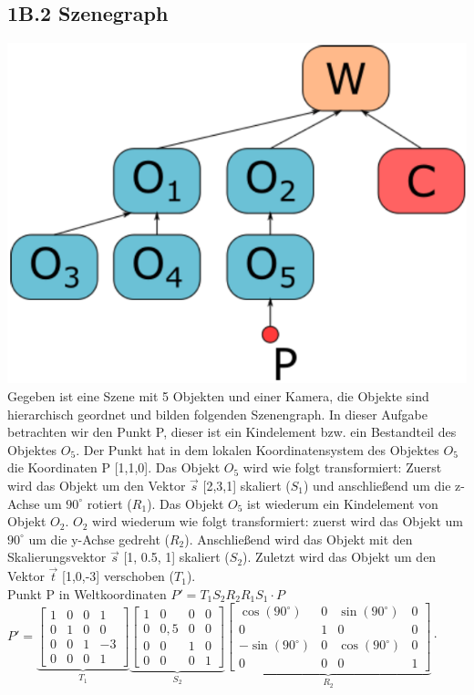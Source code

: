 \documentclass[11pt, a4paper]{article} %
\begin{document}
\subsection*{1B.2 Szenegraph}
\includegraphics[scale=0.5]{sg.png} \\
Gegeben ist eine Szene mit 5 Objekten und einer Kamera, die Objekte sind hierarchisch geordnet und bilden folgenden Szenengraph. In dieser Aufgabe betrachten wir den Punkt P, dieser ist ein Kindelement bzw. ein Bestandteil des Objektes $O_5$. Der Punkt hat in dem lokalen Koordinatensystem des Objektes $O_5$ die Koordinaten P [1,1,0]. Das Objekt $O_5$ wird wie folgt transformiert: Zuerst wird das Objekt um den Vektor $\vec{s}$ [2,3,1] skaliert ($S_1$) und anschließend um die z-Achse um $90^\circ$ rotiert ($R_1$). Das Objekt $O_5$ ist wiederum ein Kindelement von Objekt $O_2$. $O_2$ wird wiederum wie folgt transformiert: zuerst wird das Objekt um $90^\circ$ um die y-Achse gedreht ($R_2$). Anschließend wird das Objekt mit den Skalierungsvektor $\vec{s}$ [1, 0.5, 1] skaliert ($S_2$). Zuletzt wird das Objekt um den Vektor $\vec{t}$ [1,0,-3] verschoben ($T_1$). \\
Punkt P in Weltkoordinaten $P'= T_1S_2R_2R_1S_1\cdot P$ \\[0.5cm]
$P' = \underbrace{\begin{bmatrix}
	1 & 0 & 0 & 1 \\ 0 & 1 & 0 & 0 \\ 0 & 0 & 1 & -3 \\ 0 & 0 & 0 & 1
\end{bmatrix}}_{T_1} \underbrace{\begin{bmatrix}
1 & 0 & 0 & 0 \\ 0 & 0,5 & 0 & 0 \\ 0 & 0 & 1 & 0 \\ 0 & 0 & 0 & 1
\end{bmatrix}}_{S_2} \underbrace{\begin{bmatrix}
\cos(90^\circ) & 0 & \sin(90^\circ) & 0 \\ 0 & 1 & 0 & 0 \\ -\sin(90^\circ) & 0 & \cos(90^\circ) & 0 \\ 0 & 0 & 0 & 1
\end{bmatrix}}_{R_2} \cdot$ \\
\end{document}
